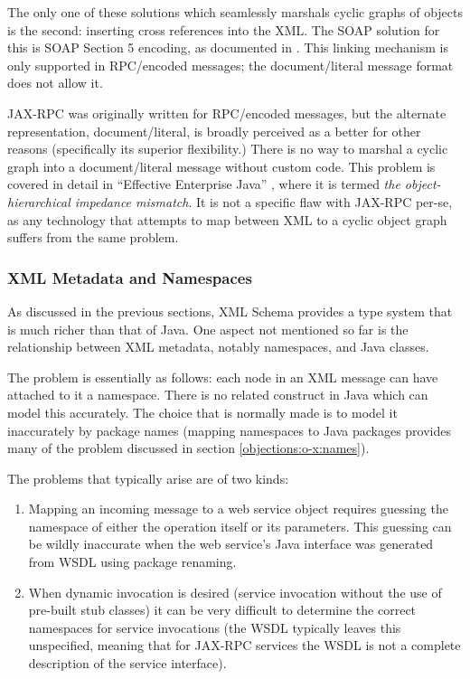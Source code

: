 The only one of these solutions which seamlessly marshals cyclic
graphs of objects is the second: inserting cross references into the
XML. The SOAP solution for this is SOAP Section 5 encoding, as
documented in \cite{spec:SOAP1.1}. This linking mechanism is only
supported in RPC/encoded messages; the document/literal message format
does not allow it.

JAX-RPC was originally written for RPC/encoded messages, but the
alternate representation, document/literal, is broadly perceived as a
better for other reasons (specifically its superior flexibility.)
There is no way to marshal a cyclic graph into a document/literal
message without custom code. This problem is covered in detail in
``Effective Enterprise Java'' \cite{neward:EEJ}, where it is termed
\emph{the object-hierarchical impedance mismatch}. It is not a
specific flaw with JAX-RPC per-se, as any technology that attempts to
map between XML to a cyclic object graph suffers from the same
problem.

\subsubsection{XML Metadata and Namespaces}
\label{objections:o-x:namespaces}

As discussed in the previous sections, XML Schema provides a type
system that is much richer than that of Java. One aspect not mentioned
so far is the relationship between XML metadata, notably namespaces,
and Java classes.

The problem is essentially as follows: each node in an XML message can
have attached to it a namespace. There is no related construct in Java
which can model this accurately. The choice that is normally made is
to model it inaccurately by package names (mapping namespaces to Java
packages provides many of the problem discussed in section
\ref{objections:o-x:names}). 

The problems that typically arise are of two kinds:
\begin{enumerate}
\item Mapping an incoming message to a web service object requires
guessing the namespace of either the operation itself or its
parameters. This guessing can be wildly inaccurate when the web
service's Java interface was generated from WSDL using package
renaming.
\item When dynamic invocation is desired (service invocation without
the use of pre-built stub classes) it can be very difficult to
determine the correct namespaces for service invocations (the WSDL
typically leaves this unspecified, meaning that for JAX-RPC services
the WSDL is not a complete description of the service interface).
\end{enumerate}

